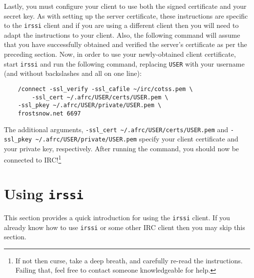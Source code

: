 \documentclass{article}
\begin{document}
{Lastly, you must configure your client to use both the signed certificate and your secret key.  As with setting up the server certificate, these instructions are specific to the \texttt{irssi} client and if you are using a different client then you will need to adapt the instructions to your client.  Also, the following command will assume that you have successfully obtained and verified the server's certificate as per the preceding section.  Now, in order to use your newly-obtained client certificate, start \texttt{irssi} and run the following command, replacing \texttt{USER} with your username (and without backslashes and all on one line):
\begin{lstlisting}
    /connect -ssl_verify -ssl_cafile ~/irc/cotss.pem \
        -ssl_cert ~/.afrc/USER/certs/USER.pem \
	-ssl_pkey ~/.afrc/USER/private/USER.pem \
	frostsnow.net 6697
\end{lstlisting}
The additional arguments, \texttt{-ssl\_cert \textasciitilde/.afrc/USER/certs/USER.pem} and \texttt{-ssl\_pkey \textasciitilde/.afrc/USER/private/USER.pem} specify your client certificate and your private key, respectively.  After running the command, you should now be connected to IRC!\footnote{If not then curse, take a deep breath, and carefully re-read the instructions.  Failing that, feel free to contact someone knowledgeable for help.}

\section{Using \texttt{irssi}}
This section provides a quick introduction for using the \texttt{irssi} client.  If you already know how to use \texttt{irssi} or some other IRC client then you may skip this section.

}
\end{document}

